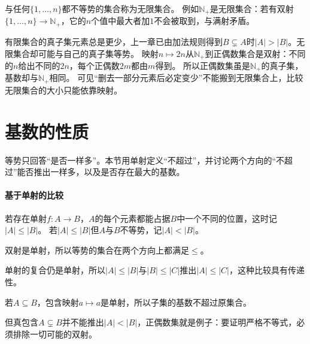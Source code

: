 与任何$\{1,\ldots,n\}$都不等势的集合称为无限集合。
例如$\mathbb N_+$是无限集合：若有双射$\{1,\ldots,n\}\to\mathbb N_+$，它的$n$个值中最大者加$1$不会被取到，与满射矛盾。

有限集合的真子集元素总是更少，上一章已由加法规则得到$B\subsetneq A$时$|A|>|B|$。无限集合却可能与自己的真子集等势。
映射$n\mapsto2n$从$\mathbb N_+$到正偶数集合是双射：不同的$n$给出不同的$2n$，每个正偶数$2m$都由$m$得到。
所以正偶数集虽是$\mathbb N_+$的真子集，基数却与$\mathbb N_+$相同。
可见“删去一部分元素后必定变少”不能搬到无限集合上，比较无限集合的大小只能依靠映射。

\section{基数的性质}
\label{sec:comb-cardinality-properties}

等势只回答“是否一样多”。本节用单射定义“不超过”，并讨论两个方向的“不超过”能否推出一样多，以及是否存在最大的基数。

\paragraph{基于单射的比较}
若存在单射$f:A\to B$，$A$的每个元素都能占据$B$中一个不同的位置，这时记$|A|\leq|B|$。
若$|A|\leq|B|$但$A$与$B$不等势，记$|A|<|B|$。

双射是单射，所以等势的集合在两个方向上都满足$\leq$。

单射的复合仍是单射，所以$|A|\leq|B|$与$|B|\leq|C|$推出$|A|\leq|C|$，这种比较具有传递性。

若$A\subseteq B$，包含映射$a\mapsto a$是单射，所以子集的基数不超过原集合。

但真包含$A\subsetneq B$并不能推出$|A|<|B|$，正偶数集就是例子：要证明严格不等式，必须排除一切可能的双射。

